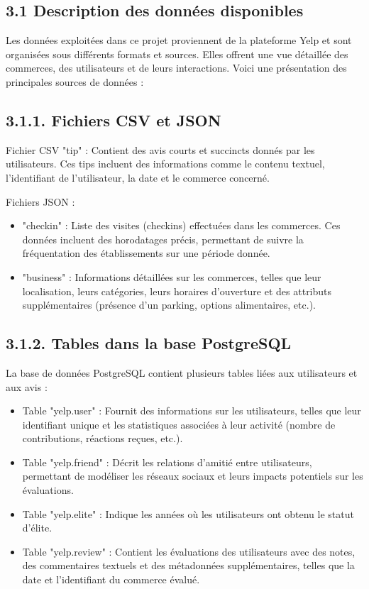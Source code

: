 \subsection*{3.1 Description des données disponibles}
Les données exploitées dans ce projet proviennent de la plateforme Yelp et sont organisées sous différents formats et sources. Elles offrent une vue détaillée des commerces, des utilisateurs et de leurs interactions. Voici une présentation des principales sources de données :


\subsection*{3.1.1. Fichiers CSV et JSON}

Fichier CSV "tip" : Contient des avis courts et succincts donnés par les utilisateurs. Ces tips incluent des informations comme le contenu textuel, l’identifiant de l’utilisateur, la date et le commerce concerné.


Fichiers JSON :

\begin{itemize}
\item "checkin" : Liste des visites (checkins) effectuées dans les commerces. Ces données incluent des horodatages précis, permettant de suivre la fréquentation des établissements sur une période donnée.


\item "business" : Informations détaillées sur les commerces, telles que leur localisation, leurs catégories, leurs horaires d'ouverture et des attributs supplémentaires (présence d’un parking, options alimentaires, etc.).


\end{itemize}

\subsection*{3.1.2. Tables dans la base PostgreSQL}
La base de données PostgreSQL contient plusieurs tables liées aux utilisateurs et aux avis :

\begin{itemize}
\item Table "yelp.user" : Fournit des informations sur les utilisateurs, telles que leur identifiant unique et les statistiques associées à leur activité (nombre de contributions, réactions reçues, etc.).


\item Table "yelp.friend" : Décrit les relations d’amitié entre utilisateurs, permettant de modéliser les réseaux sociaux et leurs impacts potentiels sur les évaluations.


\item Table "yelp.elite" : Indique les années où les utilisateurs ont obtenu le statut d’élite.


\item Table "yelp.review" : Contient les évaluations des utilisateurs avec des notes, des commentaires textuels et des métadonnées supplémentaires, telles que la date et l’identifiant du commerce évalué.


\end{itemize}


